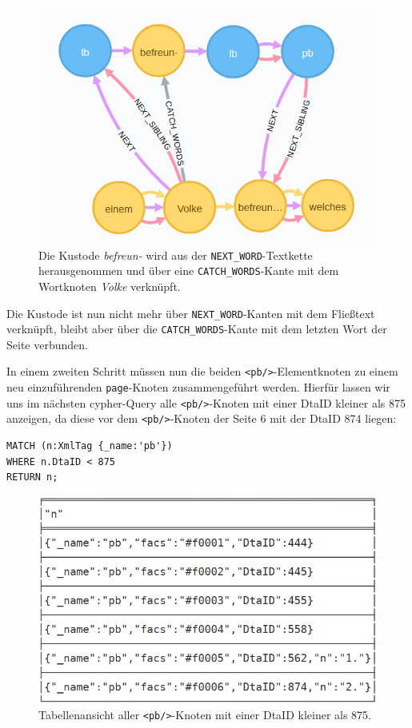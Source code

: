 \documentclass[12pt,ngerman,]{article}
\begin{document}
\begin{figure}
\centering
\includegraphics{Bilder/TEI2Graph/fw-catch-words.png}
\caption{Die Kustode \emph{befreun-} wird aus der
\texttt{NEXT\_WORD}-Textkette herausgenommen und über eine
\texttt{CATCH\_WORDS}-Kante mit dem Wortknoten \emph{Volke} verknüpft.}
\end{figure}

Die Kustode ist nun nicht mehr über \texttt{NEXT\_WORD}-Kanten mit dem
Fließtext verknüpft, bleibt aber über die \texttt{CATCH\_WORDS}-Kante
mit dem letzten Wort der Seite verbunden.

In einem zweiten Schritt müssen nun die beiden
\texttt{\textless{}pb/\textgreater{}}-Elementknoten zu einem neu
einzuführenden \texttt{page}-Knoten zusammengeführt werden. Hierfür
lassen wir uns im nächsten cypher-Query alle
\texttt{\textless{}pb/\textgreater{}}-Knoten mit einer DtaID kleiner als
875 anzeigen, da diese vor dem
\texttt{\textless{}pb/\textgreater{}}-Knoten der Seite 6 mit der DtaID
874 liegen:

\begin{verbatim}
MATCH (n:XmlTag {_name:'pb'})
WHERE n.DtaID < 875
RETURN n;
\end{verbatim}

\begin{figure}
\centering
\includegraphics{Bilder/TEI2Graph/pb-Element-Tabelle.png}
\caption{Tabellenansicht aller
\texttt{\textless{}pb/\textgreater{}}-Knoten mit einer DtaID kleiner als
875.}
\end{figure}
\end{document}
